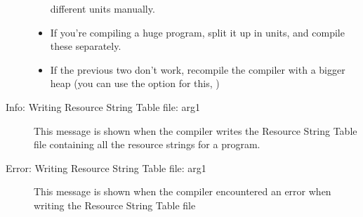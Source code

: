 \begin{description}
\begin{itemize}
 different units manually.
 \item If you're compiling a huge program, split it up in units, and compile
 these separately.
 \item If the previous two don't work, recompile the compiler with a bigger
 heap (you can use the  option for this, )
 \end{itemize}
\item [Info: Writing Resource String Table file: arg1]
 This message is shown when the compiler writes the Resource String Table
 file containing all the resource strings for a program.
\item [Error: Writing Resource String Table file: arg1]
 This message is shown when the compiler encountered an error when writing
 the Resource String Table file
 \end{description}
